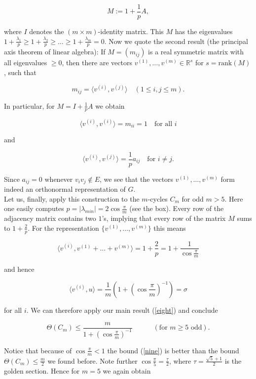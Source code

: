 \[
M := 1 + {\frac{1}{p}}A,
\]

where $I$ denotes the $(m \times m)$-identity matrix. This $M$ has the eigenvalues
$1+{\frac{\lambda_1}{p}} \geq 1+{\frac{\lambda_2}{p}} \geq \ldots \geq 1+{\frac{\lambda_m}{p}} =0$. Now we quote the second result (the principal axis theorem of linear algebra):
If $M = (m_{ij})$ is a real symmetric matrix with all eigenvalues $\geq 0$,
then there are vectors $v^{(1)}, \ldots, v^{(m)} \in \mathbb{R}^s$
for $s = \text{rank}(M)$, such that 

\[
m_{ij} = \langle v^{(i)}, v^{(j)} \rangle  \quad  (1 \leq i,j \leq m).
\]

In particular, for $M = I + {\frac{1}{p}}A$ we obtain

\[
\langle v^{(i)}, v^{(i)} \rangle = m_{ii} = 1  \quad \text{for all }i
\]

and

\[
\langle v^{(i)}, v^{(j)} \rangle = {\frac{1}{p}}a_{ij} \quad \text{for }i \neq j.
\]

Since $a_{ij} = 0 $ whenever $ v_i v_j \notin E$, we see that the 
vectors $v^{(1)},\ldots,v^{(m)}$ form indeed an orthonormal representation of $G$.\\[5pt]
Let us, finally, apply this construction to the $m$-cycles $C_m$ for odd $m > 5$. 
Here one easily computes $p = |\lambda_{min}| = 2\cos{\frac{\pi}{m}}$ (see the box). Every 
row of the adjacency matrix contains two $1$'s, implying that every row of 
the matrix $M$ sums to $1 + {\frac{2}{p}}$. For the representation $\{ v^{(1)}, \ldots, v^{(m)}\}$ this
means

\[ 
    \langle v^{(i)},v^{(1)}+ \ldots + v^{(m)} \rangle=1+{\frac{2}{p}}=1+{\frac{1}{\cos{\frac{\pi}{m}}}}
\]

and hence 

\[
\langle v^{(i)},u \rangle = {\frac{1}{m}}(1+(\cos{\frac{\pi}{m}})^{-1})=\sigma
\]

for all $i$. We can therefore apply our main result (\ref{eight}) and conclude

\begin{equation}
    \Theta(C_m) \leq {\frac{m}{1+(\cos{\frac{\pi}{m}})^{-1}}} \quad\quad\quad (\text{for $m \geq 5$ odd}).\label{nine}    
\end{equation}


\setnewpagemargins

Notice that because of $\cos{\frac{\pi}{m}} < 1$ the bound (\ref{nine}) is better than the bound 
$\Theta(C_m) \leq {\frac{m}{2}}$ we found before. Note further $\cos{\frac{\pi}{5}} = {\frac{\tau}{2}}$, where $\tau = {\frac{\sqrt{5}+1}{2}}$
is the golden section. Hence for $m = 5$ we again obtain

